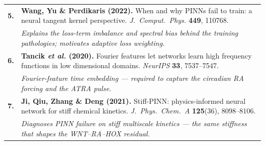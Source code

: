 \documentclass[aspectratio=169,11pt]{beamer}
\newcommand{\refnum}[1]{\textcolor{SAblue}{\bfseries #1}}
\newcommand{\refwhy}[1]{{\itshape\color{SAgrey}#1}}
\begin{document}
\begin{frame}[plain]
\begin{minipage}{0.965\textwidth}
\begin{textcard}[left=16pt,right=16pt,top=10pt,bottom=10pt]
\begin{tabular}{@{}p{0.5cm}@{}p{\dimexpr\linewidth-0.5cm\relax}@{}}
        \refnum{5.} & \textbf{Wang, Yu \& Perdikaris (2022).}
          When and why PINNs fail to train: a neural tangent kernel perspective.
          \emph{J.\ Comput.\ Phys.} \textbf{449}, 110768.\\[1pt]
        & \refwhy{Explains the loss-term imbalance and spectral bias behind the training pathologies; motivates adaptive loss weighting.}\\[3.5pt]

        \refnum{6.} & \textbf{Tancik \emph{et al.} (2020).}
          Fourier features let networks learn high frequency functions in low
          dimensional domains. \emph{NeurIPS} \textbf{33}, 7537--7547.\\[1pt]
        & \refwhy{Fourier-feature time embedding --- required to capture the circadian RA forcing and the ATRA pulse.}\\[3.5pt]

        \refnum{7.} & \textbf{Ji, Qiu, Zhang \& Deng (2021).}
          Stiff-PINN: physics-informed neural network for stiff chemical kinetics.
          \emph{J.\ Phys.\ Chem.\ A} \textbf{125}(36), 8098--8106.\\[1pt]
        & \refwhy{Diagnoses PINN failure on stiff multiscale kinetics --- the same stiffness that shapes the WNT--RA--HOX residual.}\\
      \end{tabular}
    \end{textcard}
  \end{minipage}
\end{frame}
\end{document}
